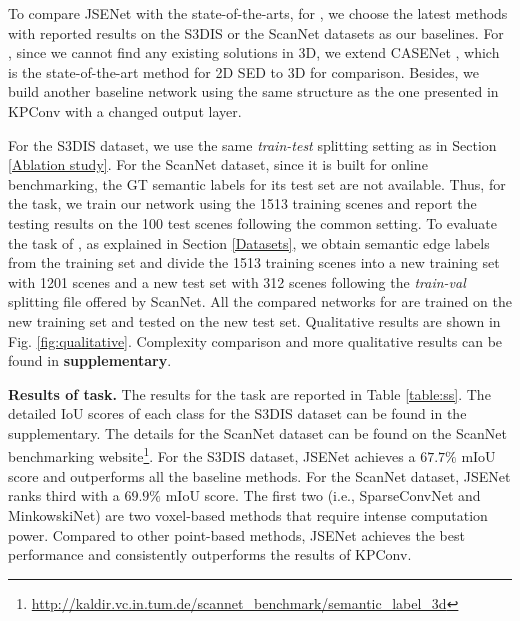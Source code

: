 \documentclass[runningheads]{llncs}
\begin{document}
To compare JSENet with the state-of-the-arts, for {\SemSeg}, we choose the latest methods {\cite{li2018pointcnn,jaritz2019multi,qi2017pointnet,jiang2019hierarchical,Choy_2019,tchapmi2017segcloud,tatarchenko2018tangent,ye20183d,landrieu2018large,rethage2018fully,wang2018deep,narita2019panopticfusion,huang2019texturenet,lei2019spherical,hermosilla2018monte,su2018splatnet,zhang2018efficient,wu2019pointconv,graham20183d}} with reported results on {the} S3DIS or the ScanNet datasets as {our} baselines.
For {\SemEdgeD}, since we cannot find any existing {solutions} in 3D, we extend CASENet \cite{yu2017casenet}, which is the state-of-the-art method {for 2D SED}
to 3D {for comparison.}
Besides, we build another baseline network using the same structure as the one presented in KPConv with a changed output layer. 


For the S3DIS dataset, we use the same \emph{train-test} splitting setting as in Section \ref{Ablation study}.
For the ScanNet dataset, since it is built for online benchmarking, the GT semantic labels for its test set are not available. Thus, for {the} {\SemSeg} task, we train our network using the 1513 training scenes and report the testing result{s} on the 100 test scenes following the common setting. To evaluate the task of {\SemEdgeD}, as explained in Section \ref{Datasets}, we obtain semantic edge labels from the training set and divide the 1513 training scenes into a new training set with 1201 scenes and a new test set with 312 scenes following the {\emph{train-val}} splitting file offered by ScanNet. All the compared networks for {\SemEdgeD} are trained on the new training set and tested on the new test set. Qualitative results are shown in Fig. \ref{fig:qualitative}. Complexity comparison and more qualitative results can be found in \textbf{supplementary}.



\smallskip \noindent \textbf{Results of {\SemSeg} task.}
The results for the {\SemSeg} task are reported in Table \ref{table:ss}. The detailed IoU scores of each class for the S3DIS dataset can be found in the supplementary. The details for the ScanNet dataset can be found on the ScanNet benchmarking website\footnote{\url{http://kaldir.vc.in.tum.de/scannet_benchmark/semantic_label_3d}}.
For the S3DIS dataset, JSENet {achieves a $67.7\%$ mIoU score and} outperforms all the baseline methods.
For the ScanNet dataset, JSENet ranks third with a $69.9\%$ mIoU score. The first two (i.e., SparseConvNet and MinkowskiNet) are two voxel-based methods that require intense computation power. {Compared to other point-based methods, JSENet achieves the best performance and consistently outperforms the results of KPConv.}
\end{document}
